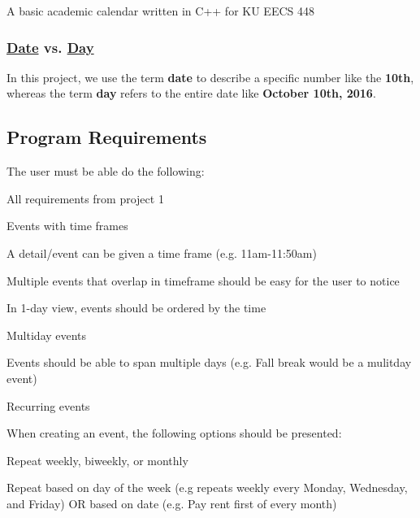 A basic academic calendar written in C++ for KU E\+E\+CS 448

\subsubsection*{\hyperlink{struct_date}{Date} vs. \hyperlink{class_day}{Day}}

In this project, we use the term {\bfseries date} to describe a specific number like the {\bfseries 10th}, whereas the term {\bfseries day} refers to the entire date like {\bfseries October 10th, 2016}.

\subsection*{Program Requirements}

The user must be able do the following\+:
\begin{DoxyItemize}
\item All requirements from project 1
\item Events with time frames
\begin{DoxyItemize}
\item A detail/event can be given a time frame (e.\+g. 11am-\/11\+:50am)
\item Multiple events that overlap in timeframe should be easy for the user to notice
\item In 1-\/day view, events should be ordered by the time
\end{DoxyItemize}
\item Multiday events
\begin{DoxyItemize}
\item Events should be able to span multiple days (e.\+g. Fall break would be a mulitday event)
\end{DoxyItemize}
\item Recurring events
\begin{DoxyItemize}
\item When creating an event, the following options should be presented\+:
\begin{DoxyItemize}
\item Repeat weekly, biweekly, or monthly
\item Repeat based on day of the week (e.\+g repeats weekly every Monday, Wednesday, and Friday) OR based on date (e.\+g. Pay rent first of every month)
\end{DoxyItemize}
\end{DoxyItemize}
\end{DoxyItemize}

